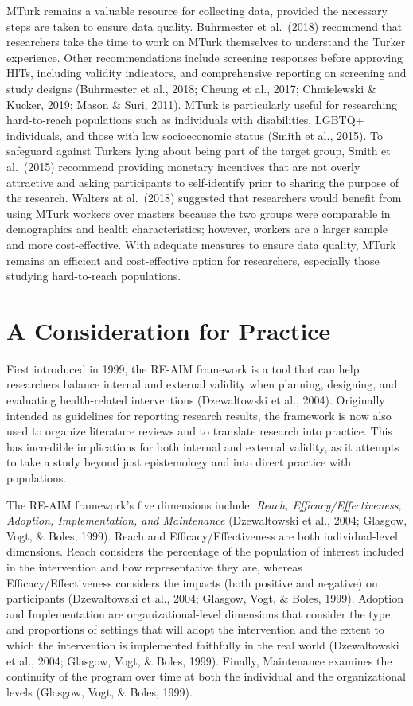 \documentclass[
  11pt,
]{book}
\begin{document}
MTurk remains a valuable resource for collecting data, provided the necessary steps are taken to ensure data quality. Buhrmester et al.~(2018) recommend that researchers take the time to work on MTurk themselves to understand the Turker experience. Other recommendations include screening responses before approving HITs, including validity indicators, and comprehensive reporting on screening and study designs (Buhrmester et al., 2018; Cheung et al., 2017; Chmielewski \& Kucker, 2019; Mason \& Suri, 2011). MTurk is particularly useful for researching hard-to-reach populations such as individuals with disabilities, LGBTQ+ individuals, and those with low socioeconomic status (Smith et al., 2015). To safeguard against Turkers lying about being part of the target group, Smith et al.~(2015) recommend providing monetary incentives that are not overly attractive and asking participants to self-identify prior to sharing the purpose of the research. Walters at al.~(2018) suggested that researchers would benefit from using MTurk workers over masters because the two groups were comparable in demographics and health characteristics; however, workers are a larger sample and more cost-effective. With adequate measures to ensure data quality, MTurk remains an efficient and cost-effective option for researchers, especially those studying hard-to-reach populations.

\hypertarget{a-consideration-for-practice}{%
\section{A Consideration for Practice}\label{a-consideration-for-practice}}

First introduced in 1999, the RE-AIM framework is a tool that can help researchers balance internal and external validity when planning, designing, and evaluating health-related interventions (Dzewaltowski et al., 2004). Originally intended as guidelines for reporting research results, the framework is now also used to organize literature reviews and to translate research into practice. This has incredible implications for both internal and external validity, as it attempts to take a study beyond just epistemology and into direct practice with populations.

The RE-AIM framework's five dimensions include: \emph{Reach, Efficacy/Effectiveness, Adoption, Implementation, and Maintenance} (Dzewaltowski et al., 2004; Glasgow, Vogt, \& Boles, 1999). Reach and Efficacy/Effectiveness are both individual-level dimensions. Reach considers the percentage of the population of interest included in the intervention and how representative they are, whereas Efficacy/Effectiveness considers the impacts (both positive and negative) on participants (Dzewaltowski et al., 2004; Glasgow, Vogt, \& Boles, 1999). Adoption and Implementation are organizational-level dimensions that consider the type and proportions of settings that will adopt the intervention and the extent to which the intervention is implemented faithfully in the real world (Dzewaltowski et al., 2004; Glasgow, Vogt, \& Boles, 1999). Finally, Maintenance examines the continuity of the program over time at both the individual and the organizational levels (Glasgow, Vogt, \& Boles, 1999).
\end{document}
